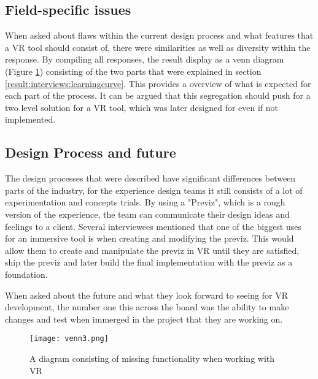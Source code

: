 \subsection{Field-specific issues}
When asked about flaws within the current design process and what features that a VR tool should consist of, there were similarities as well as diversity within the response. By compiling all responses, the result display as a venn diagram (Figure \ref{fig:result:interview:venn}) consisting of the two parts that were explained in section \ref{result:interviews:learningcurve}. This provides a overview of what is expected for each part of the process. It can be argued that this segregation should push for a two level solution for a VR tool, which was later designed for even if not implemented.
\subsection{Design Process and future}
The design processes that were described have significant differences between parts of the industry, for the experience design teams it still consists of a lot of experimentation and concepts trials. By using a "Previz", which is a rough version of the experience, the team can communicate their design ideas and feelings to a client. Several interviewees mentioned that one of the biggest uses for an immersive tool is when creating and modifying the previz. This would allow them to create and manipulate the previz in VR until they are satisfied, ship the previz and later build the final implementation with the previz as a foundation.

When asked about the future and what they look forward to seeing for VR development, the number one this across the board was the ability to make changes and test when immerged in the project that they are working on.
\begin{figure}
  \texttt{[image: venn3.png]}
  \caption{A diagram consisting of missing functionality when working with VR}
  \label{fig:result:interview:venn}
\end{figure}
